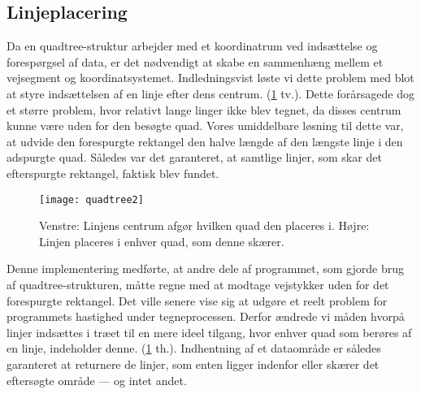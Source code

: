 \subsection{Linjeplacering}
Da en quadtree-struktur arbejder med et koordinatrum ved indsættelse og forespørgsel af data, er det nødvendigt at skabe en sammenhæng mellem et vejsegment og koordinatsystemet. Indledningsvist løste vi dette problem med blot at styre indsættelsen af en linje efter dens centrum. (\ref{fig:quadtree2} tv.). Dette forårsagede dog et større problem, hvor relativt lange linger ikke blev tegnet, da disses centrum kunne være uden for den besøgte quad. Vores umiddelbare løsning til dette var, at udvide den forespurgte rektangel den halve længde af den længste linje i den adspurgte quad. Således var det garanteret, at samtlige linjer, som skar det efterspurgte rektangel, faktisk blev fundet.
\begin{figure}[ht]
	\centering
	\texttt{[image: quadtree2]}
	\captionsetup{width=0.8\textwidth}
	\caption{Venstre: Linjens centrum afgør hvilken quad den placeres i. Højre: Linjen placeres i enhver quad, som denne skærer.}
	\label{fig:quadtree2}
\end{figure}
Denne implementering medførte, at andre dele af programmet, som gjorde brug af quadtree-strukturen, måtte regne med at modtage vejstykker uden for det forespurgte rektangel. Det ville senere vise sig at udgøre et reelt problem for programmets hastighed under tegneprocessen. Derfor ændrede vi måden hvorpå linjer indsættes i træet til en mere ideel tilgang, hvor enhver quad som berøres af en linje, indeholder denne. (\ref{fig:quadtree2} th.). Indhentning af et dataområde er således garanteret at returnere de linjer, som enten ligger indenfor eller skærer det eftersøgte område --- og intet andet.

